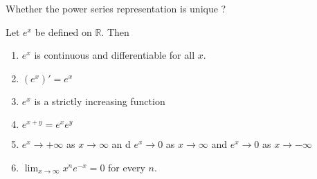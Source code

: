 \begin{doubt}
Whether the power series representation is unique ?
\end{doubt}

\begin{theorem}
	Let $e^x$ be defined on $\mathbb{R}$.
	Then
	\begin{enumerate}
		\item $e^x$ is continuous and differentiable for all $x$.
		\item $(e^x)' = e^x$
		\item $e^x$ is a strictly increasing function
		\item $e^{x+y} = e^x e^y$
		\item $e^x \to +\infty$ as $x \to \infty$ an d $e^x \to 0$ as $x \to \infty$ and $e^x \to 0$ as $x \to -\infty$
		\item $\displaystyle \lim_{x \to \infty} x^ne^{-x} = 0$ for every $n$.
	\end{enumerate}
\end{theorem}
